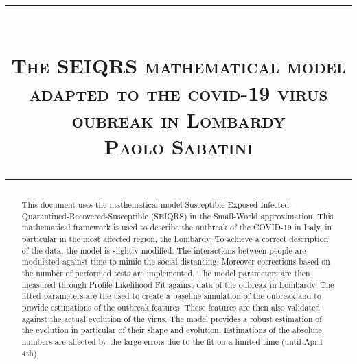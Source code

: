 \documentclass{article}
\title{
\begin{flushleft}
\rule{\textwidth}{1pt}\\
  \textsc{\textbf{The SEIQRS mathematical model adapted to the covid-19 virus oubreak in Lombardy}}\\[2mm]
\textsc{\large Paolo Sabatini}\\
\rule{\textwidth}{1pt}
  \end{flushleft}
}
\date{}
\begin{document}
\maketitle


\begin{abstract}
This document uses the mathematical model Susceptible-Exposed-Infected-Quarantined-Recovered-Susceptible (SEIQRS) in the Small-World approximation. This mathematical framework is used to describe the outbreak of the COVID-19 in Italy, in particular in the most affected region, the Lombardy. To achieve a correct description of the data, the model is slightly modified. The interactions between people are modulated against time to mimic the social-distancing. Moreover corrections based on the number of performed tests are implemented. The model parameters are then measured through Profile Likelihood Fit against data of the oubreak in Lombardy. The fitted parameters are the used to create a baseline simulation of the oubreak and to provide estimations of the outbreak features. These features are then also validated against the actual evolution of the virus. The model provides a robust estimation of the evolution in particular of their shape and evolution. Estimations of the absolute numbers are affected by the large errors due to the fit on a limited time (until April 4th).

\end{abstract}
\vspace{2cm}
\tableofcontents

\newpage






\end{document}
